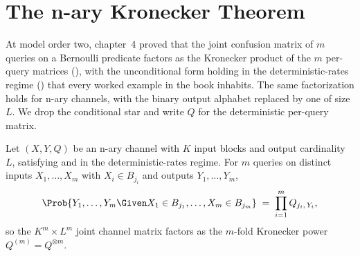 %

\section{The n-ary Kronecker Theorem}
\label{sec:n-ary-kronecker}

At model order two, chapter~4 proved that the joint confusion matrix of $m$
queries on a Bernoulli predicate factors as the Kronecker product of the $m$
per-query matrices (), with the unconditional form holding
in the deterministic-rates regime () that
every worked example in the book inhabits. The same factorization holds for
n-ary channels, with the binary output alphabet replaced by one of size $L$. We
drop the conditional star and write $Q$ for the deterministic per-query matrix.

\begin{theorem}
\label{thm:n-ary-kronecker}
Let $(X, Y, Q)$ be an n-ary channel with $K$ input blocks and output
cardinality $L$, satisfying  and
 in the deterministic-rates regime. For $m$ queries
on distinct inputs $X_1, \ldots, X_m$ with $X_i \in B_{j_i}$ and outputs
$Y_1, \ldots, Y_m$,
\[
  \Prob{Y_1, \ldots, Y_m \Given X_1 \in B_{j_1}, \ldots, X_m \in B_{j_m}}
  \;=\; \prod_{i=1}^{m} Q_{j_i,\, Y_i},
\]
so the $K^m \times L^m$ joint channel matrix factors as the $m$-fold Kronecker
power $Q^{(m)} = Q^{\otimes m}$.
\end{theorem}

